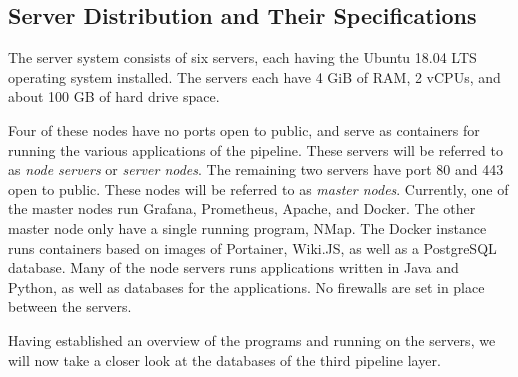 \subsection{Server Distribution and Their Specifications}
The \knox{} server system consists of six servers, each having the Ubuntu 18.04 LTS operating system installed. The servers each have 4 GiB of RAM, 2 vCPUs, and about 100 GB of hard drive space. 

Four of these nodes have no ports open to public, and serve as containers for running the various applications of the \knox{} pipeline.
These servers will be referred to as \textit{node servers} or \textit{server nodes}.
The remaining two servers have port 80 and 443 open to public. These nodes will be referred to as \textit{master nodes}.
Currently, one of the master nodes run Grafana\cite{GRAFANA}, Prometheus\cite{Prometheus}, Apache\cite{ApacheJena}, and Docker\cite{Docker_IBM}.
The other master node only have a single running program, NMap\cite{NMap}.
The Docker instance runs containers based on images of Portainer, Wiki.JS, as well as a PostgreSQL database.
Many of the node servers runs applications written in Java and Python, as well as databases for the applications. 
No firewalls are set in place between the servers.

Having established an overview of the programs and running on the servers, we will now take a closer look at the databases of the third pipeline layer.

